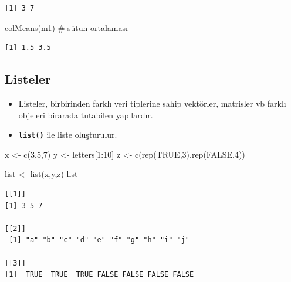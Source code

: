 \documentclass[
  letterpaper,
  DIV=11,
  numbers=noendperiod]{scrreprt}
\newenvironment{Shaded}{\begin{snugshade}}{\end{snugshade}}
\newcommand{\CommentTok}[1]{\textcolor[rgb]{0.37,0.37,0.37}{#1}}
\newcommand{\ConstantTok}[1]{\textcolor[rgb]{0.56,0.35,0.01}{#1}}
\newcommand{\DecValTok}[1]{\textcolor[rgb]{0.68,0.00,0.00}{#1}}
\newcommand{\FunctionTok}[1]{\textcolor[rgb]{0.28,0.35,0.67}{#1}}
\newcommand{\NormalTok}[1]{\textcolor[rgb]{0.00,0.23,0.31}{#1}}
\newcommand{\OtherTok}[1]{\textcolor[rgb]{0.00,0.23,0.31}{#1}}
\newcommand{\SpecialCharTok}[1]{\textcolor[rgb]{0.37,0.37,0.37}{#1}}
\begin{document}
\begin{verbatim}
[1] 3 7
\end{verbatim}

\begin{Shaded}
\begin{Highlighting}[]
\FunctionTok{colMeans}\NormalTok{(m1) }\CommentTok{\# sütun ortalaması}
\end{Highlighting}
\end{Shaded}

\begin{verbatim}
[1] 1.5 3.5
\end{verbatim}

\subsection{Listeler}\label{listeler}

\begin{itemize}
\item
  Listeler, birbirinden farklı veri tiplerine sahip vektörler, matrisler
  vb farklı objeleri birarada tutabilen yapılardır.
\item
  \textbf{\texttt{list()}} ile liste oluşturulur.
\end{itemize}

\begin{Shaded}
\begin{Highlighting}[]
\NormalTok{x }\OtherTok{\textless{}{-}} \FunctionTok{c}\NormalTok{(}\DecValTok{3}\NormalTok{,}\DecValTok{5}\NormalTok{,}\DecValTok{7}\NormalTok{)}
\NormalTok{y }\OtherTok{\textless{}{-}}\NormalTok{ letters[}\DecValTok{1}\SpecialCharTok{:}\DecValTok{10}\NormalTok{]}
\NormalTok{z }\OtherTok{\textless{}{-}} \FunctionTok{c}\NormalTok{(}\FunctionTok{rep}\NormalTok{(}\ConstantTok{TRUE}\NormalTok{,}\DecValTok{3}\NormalTok{),}\FunctionTok{rep}\NormalTok{(}\ConstantTok{FALSE}\NormalTok{,}\DecValTok{4}\NormalTok{))}

\NormalTok{list }\OtherTok{\textless{}{-}} \FunctionTok{list}\NormalTok{(x,y,z)}
\NormalTok{list}
\end{Highlighting}
\end{Shaded}

\begin{verbatim}
[[1]]
[1] 3 5 7

[[2]]
 [1] "a" "b" "c" "d" "e" "f" "g" "h" "i" "j"

[[3]]
[1]  TRUE  TRUE  TRUE FALSE FALSE FALSE FALSE
\end{verbatim}
\end{document}

